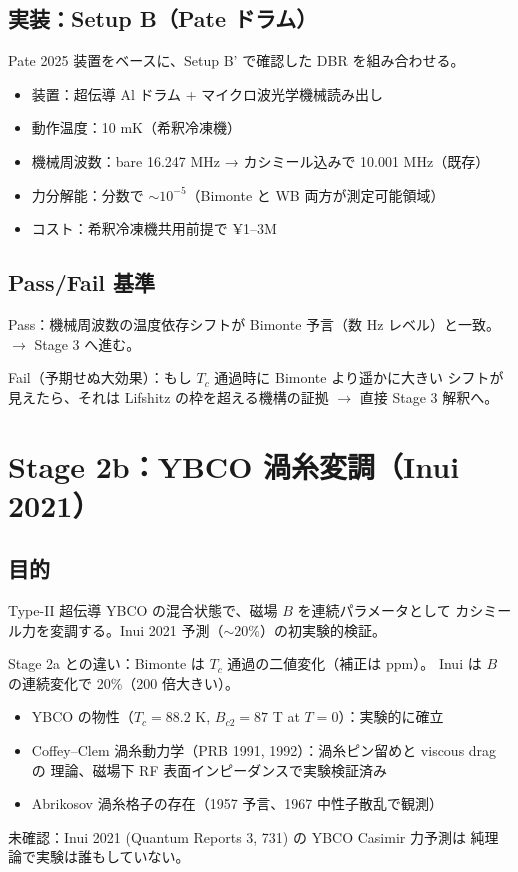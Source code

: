 \documentclass[11pt,a4paper]{article}
\def\textbf#1{#1}%
\begin{document}
\subsection{実装：Setup B（Pate ドラム）}

Pate 2025 装置をベースに、Setup B' で確認した DBR を組み合わせる。

\begin{itemize}
\item 装置：超伝導 Al ドラム + マイクロ波光学機械読み出し
\item 動作温度：10 mK（希釈冷凍機）
\item 機械周波数：bare 16.247 MHz → カシミール込みで 10.001 MHz（既存）
\item 力分解能：分数で $\sim 10^{-5}$（Bimonte と WB 両方が測定可能領域）
\item コスト：希釈冷凍機共用前提で \textbf{¥1--3M}
\end{itemize}

\subsection{Pass/Fail 基準}

\textbf{Pass}：機械周波数の温度依存シフトが Bimonte 予言（数 Hz レベル）と一致。
$\to$ Stage 3 へ進む。

\textbf{Fail（予期せぬ大効果）}：もし $T_c$ 通過時に Bimonte より遥かに大きい
シフトが見えたら、それは Lifshitz の枠を超える機構の証拠 $\to$ 直接 Stage 3 解釈へ。

\newpage

\section{Stage 2b：YBCO 渦糸変調（Inui 2021）}

\subsection{目的}

Type-II 超伝導 YBCO の混合状態で、磁場 $B$ を連続パラメータとして
カシミール力を変調する。Inui 2021 予測（$\sim 20\%$）の初実験的検証。

\textbf{Stage 2a との違い}：Bimonte は $T_c$ 通過の二値変化（補正は ppm）。
Inui は $B$ の連続変化で 20\%（200 倍大きい）。

\begin{confirmedbox}
\begin{itemize}
\item YBCO の物性（$T_c = 88.2$ K, $B_{c2} = 87$ T at $T=0$）：実験的に確立
\item Coffey--Clem 渦糸動力学（PRB 1991, 1992）：渦糸ピン留めと viscous drag の
  理論、磁場下 RF 表面インピーダンスで実験検証済み
\item Abrikosov 渦糸格子の存在（1957 予言、1967 中性子散乱で観測）
\end{itemize}

\textbf{未確認}：Inui 2021 (Quantum Reports 3, 731) の YBCO Casimir 力予測は
\textbf{純理論}で実験は誰もしていない。
\end{confirmedbox}
\end{document}
